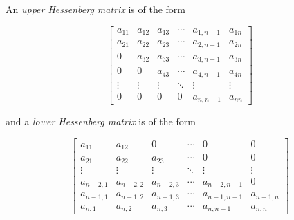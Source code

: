 \documentclass[12pt]{article}
\begin{document}
An \emph{upper Hessenberg matrix} is of the form

$$ \begin{bmatrix}
a_{11} & a_{12} & a_{13} & \cdots & a_{1,n-1} & a_{1n} \\
a_{21} & a_{22} & a_{23} & \cdots & a_{2,n-1} & a_{2n} \\
  0    & a_{32} & a_{33} & \cdots & a_{3,n-1} & a_{3n} \\
  0    &   0    & a_{43} & \cdots & a_{4,n-1} & a_{4n} \\
\vdots & \vdots & \vdots & \ddots & \vdots    & \vdots \\
  0    &    0   &    0   &   0    & a_{n,n-1} & a_{nn} 
\end{bmatrix} $$

and a \emph{lower Hessenberg matrix} is of the form

$$ \begin{bmatrix}
a_{11} & a_{12} & 0      & \cdots &   0       &  0     \\
a_{21} & a_{22} & a_{23} & \cdots &   0       &  0     \\
\vdots & \vdots & \vdots & \ddots & \vdots    & \vdots \\
a_{n-2,1} & a_{n-2,2} & a_{n-2,3} & \cdots & a_{n-2,n-1} & 0 \\
a_{n-1,1} & a_{n-1,2} & a_{n-1,3} & \cdots & a_{n-1,n-1} & a_{n-1,n} \\
a_{n,1} & a_{n,2} & a_{n,3} & \cdots & a_{n,n-1} & a_{n,n} 
\end{bmatrix} $$
\end{document}
